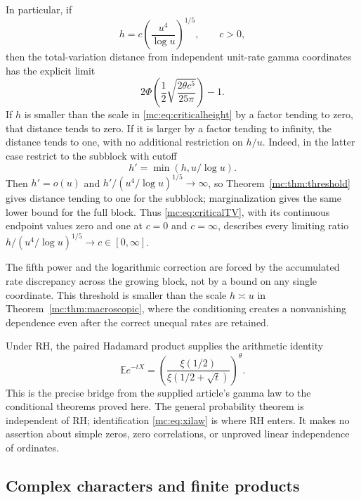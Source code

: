 In particular, if
\begin{equation}\label{mc:eq:criticalheight}
 h=c\left(\frac{u^4}{\log u}\right)^{1/5},\qquad c>0,
\end{equation}
then the total-variation distance from independent unit-rate gamma
coordinates has the explicit limit
\begin{equation}\label{mc:eq:criticalTV}
 2\Phi\left(\frac12\sqrt{\frac{2\theta c^5}{25\pi}}\right)-1.
\end{equation}
If $h$ is smaller than the scale in \eqref{mc:eq:criticalheight} by a
factor tending to zero, that distance tends to zero.  If it is larger
by a factor tending to infinity, the distance tends to one, with no
additional restriction on $h/u$.  Indeed, in the latter case restrict
to the subblock with cutoff
\[
 h'=\min(h,u/\log u).
\]
Then $h'=o(u)$ and $h'/(u^4/\log u)^{1/5}\to\infty$, so
Theorem~\ref{mc:thm:threshold} gives distance tending to one for the
subblock; marginalization gives the same lower bound for the full
block.  Thus \eqref{mc:eq:criticalTV}, with its continuous endpoint
values zero and one at $c=0$ and $c=\infty$, describes every limiting
ratio $h/(u^4/\log u)^{1/5}\to c\in[0,\infty]$.

The fifth power and the logarithmic correction are
forced by the accumulated rate discrepancy across the growing block,
not by a bound on any single coordinate.  This threshold is smaller
than the scale $h\asymp u$ in Theorem~\ref{mc:thm:macroscopic}, where
the conditioning creates a nonvanishing dependence even after the
correct unequal rates are retained.

Under RH, the paired Hadamard product supplies the arithmetic identity
\begin{equation}\label{mc:eq:xilaw}
 \mathbb E e^{-tX}
 =\left(\frac{\xi(1/2)}{\xi(1/2+\sqrt t)}\right)^\theta.
\end{equation}
This is the precise bridge from the supplied article's gamma law to
the conditional theorems proved here.  The general probability theorem is
independent of RH; identification \eqref{mc:eq:xilaw} is where RH
enters.  It makes no assertion about simple zeros, zero correlations,
or unproved linear independence of ordinates.

\subsection{Complex characters and finite products}

